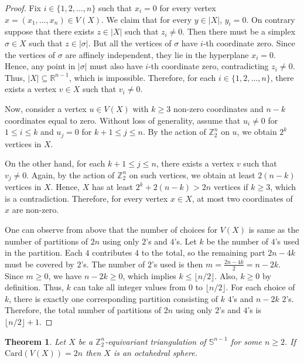 \documentclass[11pt]{amsart}
\numberwithin{equation}{section}
\newtheorem{theorem}{Theorem}[section]
\theoremstyle{definition}
\newcommand{\Sp}{\mathbb{S}}
\def \bb{\mathbb}
\def \ZZ{{\bb{Z}}}
\begin{document}
\begin{proof}
Fix $i \in \{1,2,\dots,n\}$  such that $x_i = 0$ for every vertex $x = (x_1, \ldots, x_n) \in V(X)$.  
We claim that for every $y \in |X|$, $y_i = 0$. On contrary suppose that there exists $z \in |X|$ such that $z_i \neq 0$.  
Then there must be a simplex $\sigma \in X$ such that $z \in |\sigma|$.  But all the vertices of $\sigma$ have $i$-th coordinate zero.  
Since the vertices of $\sigma$ are affinely independent, they lie in the hyperplane $x_i = 0$.  
Hence, any point in $|\sigma|$ must also have $i$-th coordinate zero, contradicting $z_i \neq 0$.  
Thus, $|X| \subseteq \mathbb{R}^{n-1}$, which is impossible.  
Therefore, for each $i \in \{1,2,\dots,n\}$, there exists a vertex $v \in X$ such that $v_i \neq 0$.

Now, consider a vertex $u \in V(X)$ with $k \ge 3$ non-zero coordinates and $n-k$ coordinates equal to zero.  
Without loss of generality, assume that $u_i \neq 0$ for $1 \le i \le k$ and $u_j = 0$ for $k+1 \le j \le n$.  
By the action of $\mathbb{Z}_2^n$ on $u$, we obtain $2^k$ vertices in $X$.  

On the other hand, for each $k+1 \le j \le n$, there exists a vertex $v$ such that $v_j \neq 0$.  
Again, by the action of $\mathbb{Z}_2^n$ on such vertices, we obtain at least $2(n-k)$ vertices in $X$.  Hence, $X$ has at least $2^k + 2(n-k) > 2n$ vertices if $k \ge 3$, which is a contradiction. Therefore, for every vertex $x \in X$, at most two coordinates of $x$ are non-zero.

One can observe from above that the number of choices for $V(X)$ is same as the number of partitions of $2n$ using only $2$'s and $4$'s.
Let $k$ be the number of $4$'s used in the partition. Each $4$ contributes $4$ to the total, so the remaining part $2n - 4k$ must be covered by $2$'s.  
The number of $2$'s used is then 
$m = \frac{2n - 4k}{2} = n - 2k.$
Since $m \ge 0$, we have $n - 2k \ge 0$, which implies $k \le \lfloor n/2 \rfloor$.  
Also, $k \ge 0$ by definition. Thus, $k$ can take all integer values from $0$ to $\lfloor n/2 \rfloor$. For each choice of $k$, there is exactly one corresponding partition consisting of $k$ $4$'s and $n-2k$ $2$'s. Therefore, the total number of partitions of $2n$ using only $2$'s and $4$'s is $\lfloor n/2 \rfloor + 1.$  
\end{proof}

\begin{theorem}\label{2nvertexsphere}
Let $X$ be a $\ZZ^{n}_2$-equivariant triangulation of $\Sp^{n-1}$ for some $n\geq 2$. If $\mathrm{Card}(V(X))=2n$ then $X$ is an octahedral sphere.
\end{theorem}
\end{document}
